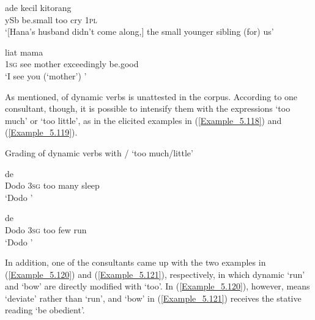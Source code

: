 \ea
\label{Example_5.116}
\gll {\ldots} {ade} {kecil} {} {} {kitorang}\\ %
  { } ySb  be.small  too  cry  \textsc{1pl}\\
\glt 
‘[Hana’s husband didn’t come along,] the small younger sibling  (for) us’ \textstyleExampleSource{[080921-002-Cv.0008]}
\z

\ea
\label{Example_5.117}
 {liat} {mama} {} {}\\ %
 \textsc{1sg}  see  mother  exceedingly  be.good\\
\glt 
‘I see you (‘mother’) ’ \textstyleExampleSource{[081115-001a-Cv.0324]}
\z


As mentioned,  of  dynamic verbs is unattested in the corpus. According to one consultant, though, it is possible to intensify them with the expressions  ‘too much’ or  ‘too little’, as in the elicited examples in (\ref{Example_5.118}) and (\ref{Example_5.119}).


\begin{styleExampleTitle}
Grading of  dynamic verbs with / ‘too much\-/little’
\end{styleExampleTitle}

\ea
\label{Example_5.118}
 {de} {} {} {}\\ %
 Dodo  \textsc{3sg}  too  many  sleep\\
\glt 
‘Dodo ’ \textstyleExampleSource{[Elicited BR130410.005]}
\z

\ea
\label{Example_5.119}
 {de} {} {} {}\\ %
 Dodo  \textsc{3sg}  too  few  run\\
\glt 
‘Dodo ’ \textstyleExampleSource{[Elicited BR130410.008]}
\z


In addition, one of the consultants came up with the two examples in (\ref{Example_5.120}) and (\ref{Example_5.121}), respectively, in which dynamic  ‘run’ and  ‘bow’ are directly modified with  ‘too’. In (\ref{Example_5.120}), however,  means ‘deviate’ rather than ‘run’, and  ‘bow’ in (\ref{Example_5.121}) receives the stative reading ‘be obedient’.


